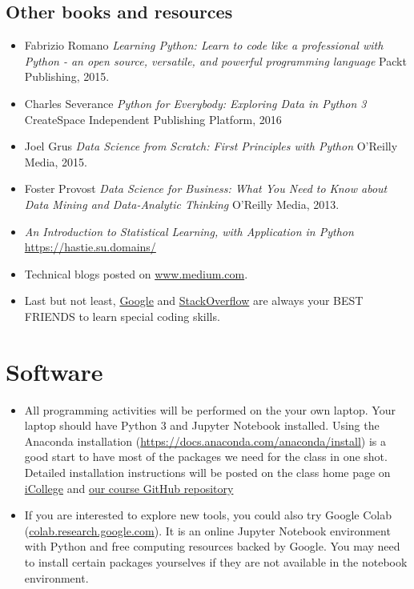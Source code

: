 \documentclass[a4paper, 12pt]{article}
\begin{document}
\subsection{Other books and resources}
  \begin{itemize}
  	\item Fabrizio Romano  \textit{Learning Python: Learn to code like a professional with Python - an open source, versatile, and powerful programming language} Packt Publishing, 2015.
  	\item Charles Severance \textit{Python for Everybody: Exploring Data in Python 3} CreateSpace Independent Publishing Platform, 2016 
    \item Joel Grus \textit{Data Science from Scratch: First Principles with Python} O'Reilly Media, 2015.
    \item Foster Provost \textit{Data Science for Business: What You Need to Know about Data Mining and Data-Analytic Thinking} O'Reilly Media, 2013.
    \item \textit{An Introduction to Statistical Learning, with Application in Python} \url{https://hastie.su.domains/}
    \item Technical blogs posted on \url{www.medium.com}.
    \item Last but not least, \href{www.google.com}{Google} and \href{www.stackoverflow.com}{StackOverflow} are always your BEST FRIENDS to learn special coding skills.
  \end{itemize}

\section{Software}
\begin{itemize}
    \item All programming activities will be performed on the your own laptop. Your laptop should have Python 3 and Jupyter Notebook installed. Using the Anaconda installation (\url{https://docs.anaconda.com/anaconda/install}) is a good start to have most of the packages we need for the class in one shot. Detailed installation instructions will be posted on the class home page on \href{https://gastate.view.usg.edu/d2l/home/xxxxxxxtbd}{iCollege} and \href{https://github.com/xiangshiyin/machine-learning-for-actuarial-science}{our course GitHub repository}
    \item If you are interested to explore new tools, you could also try Google Colab (\url{colab.research.google.com}). It is an online Jupyter Notebook environment with Python and free computing resources backed by Google. You may need to install certain packages yourselves if they are not available in the notebook environment.
\end{itemize}  
\end{document}
